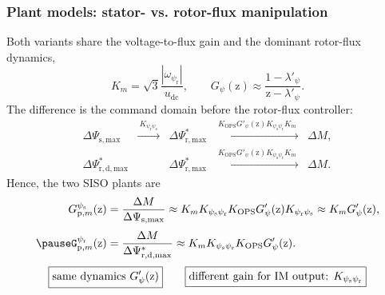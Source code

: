 \begin{frame}
    \frametitle{Plant models: stator- vs. rotor-flux manipulation}
    Both variants share the voltage-to-flux gain and the dominant rotor-flux dynamics,
    \begin{equation}
        K_m=\sqrt{3}\frac{|\omega_{\psi_{\mathrm r}}|}{u_{\mathrm{dc}}},
        \qquad
        G_{\psi}(\mathrm{z})\approx\frac{1-\lambda'_{\psi}}{\mathrm{z}-\lambda'_{\psi}} .
        \label{eq:IM_mod_v06_common_parts}
    \end{equation}\pause%
    The difference is the command domain before the rotor-flux controller:
    \begin{equation}
        \begin{array}{rclcl}
            \Delta\Psi_{\mathrm{s,max}}
             & \xrightarrow{\;K_{\psi_{\mathrm r}\psi_{\mathrm{s}}}\;}                                         &
            \Delta\Psi_{\mathrm{r,max}}^{*}
             & \xrightarrow{\;K_{\mathrm{OPS}}G'_{\psi}(\mathrm{z})K_{\psi_{\mathrm{s}}\psi_{\mathrm r}}K_m\;} &
            \Delta M,                                                                                            \\[1mm]
            \Delta\Psi_{\mathrm{r,d,max}}^{*}
             &                                                                                                 &
            \Delta\Psi_{\mathrm{r,max}}^{*}
             & \xrightarrow{\;K_{\mathrm{OPS}}G'_{\psi}(\mathrm{z})K_{\psi_{\mathrm{s}}\psi_{\mathrm r}}K_m\;} &
            \Delta M.
        \end{array}
        \label{eq:IM_mod_v06_plant_chains_compact}
    \end{equation}\pause%
    Hence, the two SISO plants are
    \begin{equation}
        \begin{aligned}
            G_{\mathrm{p},m}^{\psi_{\mathrm s}}(\mathrm{z})
             & =\frac{\Delta M}{\Delta\Psi_{\mathrm{s,max}}}
            \approx K_mK_{\psi_{\mathrm{s}}\psi_{\mathrm r}}K_{\mathrm{OPS}}G'_{\psi}(\mathrm{z})K_{\psi_{\mathrm r}\psi_{\mathrm{s}}}
            \approx K_mG'_{\psi}(\mathrm{z}),                      \\[1mm]\pause%
            G_{\mathrm{p},m}^{\psi_{\mathrm r}}(\mathrm{z})
             & =\frac{\Delta M}{\Delta\Psi_{\mathrm{r,d,max}}^{*}}
            \approx K_mK_{\psi_{\mathrm{s}}\psi_{\mathrm r}}K_{\mathrm{OPS}}G'_{\psi}(\mathrm{z}).
        \end{aligned}
        \label{eq:IM_mod_v06_plant_models_compact}
    \end{equation}\vspace{-0.1cm}\pause%
    \begin{equation}
        \boxed{\text{same dynamics }G'_{\psi}(\mathrm{z})}
        \qquad
        \boxed{\vphantom{G'}\text{different gain for IM output: }K_{\psi_{\mathrm{s}}\psi_{\mathrm r}}}
    \end{equation}
\end{frame}


